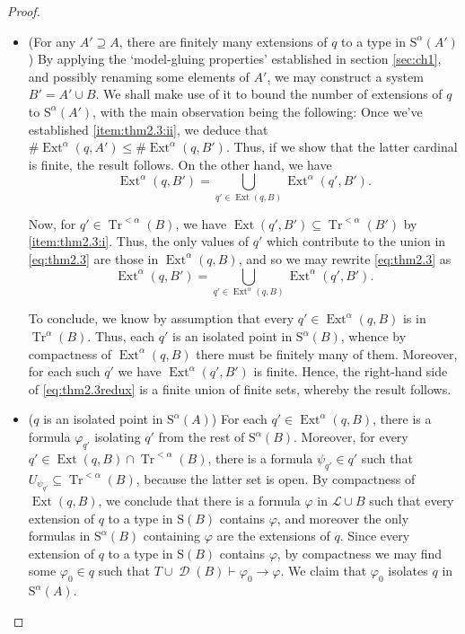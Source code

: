 \documentclass{article}
\theoremstyle{nonumberplain}
\newtheorem{proof}{Proof}
\newcommand{\Lang}{\mathcal{L}}
\newcommand{\Stone}{\mathrm{S}}
\DeclareMathOperator{\Tr}{Tr}
\DeclareMathOperator{\Ext}{Ext}
\DeclareMathOperator{\ADG}{\mathcal{D}}
\newcommand{\card}[1]{\#{#1}}
\begin{document}
\begin{proof}
\begin{itemize}
\item (For any $A' \supseteq A$, there are finitely many extensions of $q$ to a type in $\Stone^\alpha(A')$) By applying the `model-gluing properties' established in section \ref{sec:ch1}, and possibly renaming some elements of $A'$, we may construct a system $B' = A' \cup B$. We shall make use of it to bound the number of extensions of $q$ to $\Stone^\alpha(A')$, with the main observation being the following: Once we've established \ref{item:thm2.3:ii}, we deduce that $\card{\Ext^\alpha(q,A')} \leq \card{\Ext^\alpha(q,B')}$. Thus, if we show that the latter cardinal is finite, the result follows. On the other hand, we have
\begin{equation}\label{eq:thm2.3}
\Ext^\alpha(q,B') = \bigcup_{q' \in \Ext(q,B)} \Ext^\alpha(q', B').
\end{equation}

Now, for $q' \in \Tr^{<\alpha}(B)$, we have $\Ext(q',B') \subseteq \Tr^{<\alpha}(B')$ by \ref{item:thm2.3:i}. Thus, the only values of $q'$ which contribute to the union in \eqref{eq:thm2.3} are those in $\Ext^\alpha(q,B)$, and so we may rewrite \ref{eq:thm2.3} as
\begin{equation}\label{eq:thm2.3redux}
\Ext^\alpha(q,B') = \bigcup_{q' \in \Ext^\alpha(q,B)} \Ext^\alpha(q', B').
\end{equation}

To conclude, we know by assumption that every $q' \in \Ext^\alpha(q,B)$ is in $\Tr^\alpha(B)$. Thus, each $q'$ is an isolated point in $\Stone^\alpha(B)$, whence by compactness of $\Ext^\alpha(q,B)$ there must be finitely many of them. Moreover, for each such $q'$ we have $\Ext^\alpha(q',B')$ is finite. Hence, the right-hand side of \eqref{eq:thm2.3redux} is a finite union of finite sets, whereby the result follows.


\item ($q$ is an isolated point in $\Stone^\alpha(A)$) For each $q' \in \Ext^\alpha(q,B)$, there is a formula $\varphi_{q'}$ isolating $q'$ from the rest of $\Stone^\alpha(B)$. Moreover, for every $q' \in \Ext(q,B) \cap \Tr^{<\alpha}(B)$, there is a formula $\psi_{q'} \in q'$ such that $U_{\psi_{q'}} \subseteq \Tr^{<\alpha}(B)$, because the latter set is open. By compactness of $\Ext(q,B)$, we conclude that there is a formula $\varphi$ in $\Lang \cup B$ such that every extension of $q$ to a type in $\Stone(B)$ contains $\varphi$, and moreover the only formulas in $\Stone^\alpha(B)$ containing $\varphi$ are the extensions of $q$. Since every extension of $q$ to a type in $\Stone(B)$ contains $\varphi$, by compactness we may find some $\varphi_0 \in q$ such that $T \cup \ADG(B) \vdash \varphi_0 \rightarrow \varphi$. We claim that $\varphi_0$ isolates $q$ in $\Stone^\alpha(A)$.


\end{itemize}
\end{proof}
\end{document}
